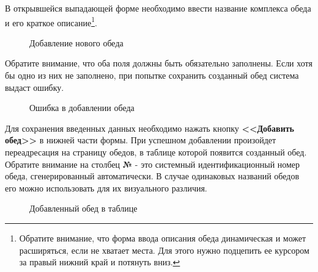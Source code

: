 \documentclass[a4paper]{article}
\begin{document}
В открывшейся выпадающей форме необходимо ввести название комплекса обеда и его краткое описание\footnote{Обратите внимание, что форма ввода описания обеда динамическая и может расширяться, если не хватает места. Для этого нужно подцепить ее курсором за правый нижний край и потянуть вниз.}.

\begin{figure}[h]
\caption{Добавление нового обеда}
\label{fig:image16}
\end{figure}

Обратите внимание, что оба поля должны быть обязательно заполнены. Если хотя бы одно из них не заполнено, при попытке сохранить созданный обед система выдаст ошибку.

\begin{figure}[h]
\caption{Ошибка в добавлении обеда}
\label{fig:image17}
\end{figure}

Для сохранения введенных данных необходимо нажать кнопку \textbf{<<Добавить обед>>} в нижней части формы. При успешном добавлении произойдет переадресация на страницу обедов, в таблице которой появится созданный обед. Обратите внимание на столбец \textbf{№} - это системный идентификационный номер обеда, сгенерированный автоматически. В случае одинаковых названий обедов его можно использовать для их визуального различия.

\begin{figure}[h]
\caption{Добавленный обед в таблице}
\label{fig:image18}
\end{figure}
\end{document}
